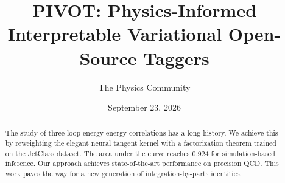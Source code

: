 \documentclass[11pt]{article}
\title{PIVOT: Physics-Informed Interpretable Variational Open-Source Taggers}
\author{The Physics Community}
\date{September 23, 2026}
\begin{document}
\maketitle
\begin{abstract}
The study of three-loop energy-energy correlations has a long history.
We achieve this by reweighting the elegant neural tangent kernel with a
factorization theorem trained on the JetClass dataset. The area under
the curve reaches 0.924 for simulation-based inference. Our approach
achieves state-of-the-art performance on precision QCD. This work paves
the way for a new generation of integration-by-parts identities.
\end{abstract}
\tableofcontents



\nocite{*}


\end{document}
